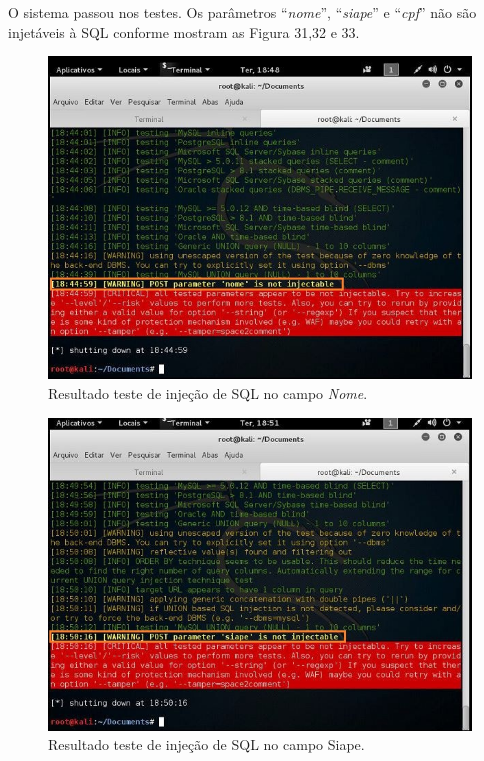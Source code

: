\documentclass[
    12pt,               %
    openright,          %
    oneside,            %
    a4paper,            %
    section=TITLE,     %
    english,            %
    french,             %
    spanish,            %
    brazil              %
    ]{abntex2}
\begin{document}
O sistema passou nos testes. Os parâmetros \textquotedblleft{}\emph{nome}\textquotedblright{}, \textquotedblleft{}\emph{siape}\textquotedblright{} e \textquotedblleft{}\emph{cpf}\textquotedblright{} não são injetáveis à SQL conforme mostram as Figura 31,32 e 33.





\begin{figure}[htp]
\centering
\caption{Resultado teste de injeção de SQL no campo \emph{Nome}.}
\includegraphics[width=450px]{image28.jpeg}
\end{figure}
\ifdefined\FloatBarrier \FloatBarrier \fi





\begin{figure}[htp]
\centering
\caption{Resultado teste de injeção de SQL no campo Siape.}
\includegraphics[width=450px]{image29.jpeg}
\end{figure}
\ifdefined\FloatBarrier \FloatBarrier \fi
\end{document}
